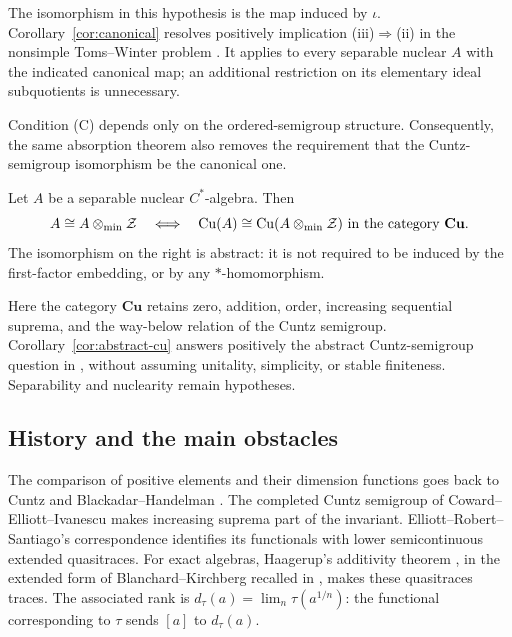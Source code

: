 The isomorphism in this hypothesis is the map induced by $\iota$.
Corollary~\ref{cor:canonical} resolves positively implication
(iii)$\Rightarrow$(ii) in the nonsimple Toms--Winter problem
\cite[Section~22, Problem~LXXV]{Problems2025}. It applies to every
separable nuclear $A$ with the indicated canonical map; an additional
restriction on its elementary ideal subquotients is unnecessary.

Condition \textup{(C)} depends only on the ordered-semigroup structure.
Consequently, the same absorption theorem also removes the requirement
that the Cuntz-semigroup isomorphism be the canonical one.

\begin{corollary}
\label{cor:abstract-cu}
Let $A$ be a separable nuclear $C^*$-algebra. Then
\[
 A\cong A\otimes_{\min}\mathcal Z
 \quad\Longleftrightarrow\quad
 \mathrm{Cu}(A)\cong\mathrm{Cu}(A\otimes_{\min}\mathcal Z)
 \text{ in the category }\mathbf{Cu}.
\]
The isomorphism on the right is abstract: it is not required to be
induced by the first-factor embedding, or by any $*$-homomorphism.
\end{corollary}

Here the category $\mathbf{Cu}$ retains zero, addition, order, increasing
sequential suprema, and the way-below relation of the Cuntz semigroup.
Corollary~\ref{cor:abstract-cu} answers positively the abstract
Cuntz-semigroup question in
\cite[Section~9, Problem~XXVI]{Problems2025}, without assuming
unitality, simplicity, or stable finiteness. Separability and nuclearity
remain hypotheses.

\subsection{History and the main obstacles}

The comparison of positive elements and their dimension functions goes
back to Cuntz and Blackadar--Handelman
\cite{Cuntz1978,BlackadarHandelman1982}. The completed Cuntz semigroup
of Coward--Elliott--Ivanescu \cite{CEI2008} makes increasing suprema
part of the invariant. Elliott--Robert--Santiago's correspondence
\cite{ERS2011} identifies its functionals with lower semicontinuous
extended quasitraces. For exact algebras, Haagerup's additivity theorem
\cite{Haagerup2014}, in the extended form of Blanchard--Kirchberg
recalled in \cite[Remark~4.3]{ERS2011}, makes these quasitraces traces.
The associated rank is
$d_\tau(a)=\lim_n\tau(a^{1/n})$: the functional corresponding to
$\tau$ sends $[a]$ to $d_\tau(a)$.

